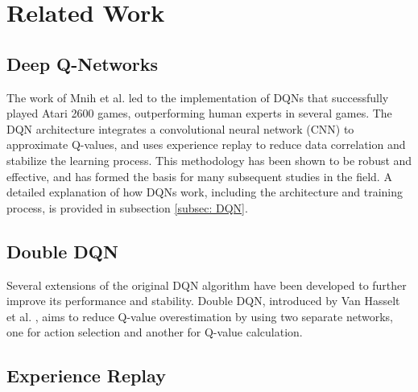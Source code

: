 \section{Related Work}

\subsection{Deep Q-Networks}

The work of Mnih et al. \cite{mnih2013playingatarideepreinforcement} led to the implementation of DQNs that successfully played Atari 2600 games, outperforming human experts in several games. The DQN architecture integrates a convolutional neural network (CNN) to approximate Q-values, and uses experience replay to reduce data correlation and stabilize the learning process. This methodology has been shown to be robust and effective, and has formed the basis for many subsequent studies in the field. A detailed explanation of how DQNs work, including the architecture and training process, is provided in subsection \ref{subsec: DQN}.

\subsection{Double DQN}
Several extensions of the original DQN algorithm have been developed to further improve its performance and stability. Double DQN, introduced by Van Hasselt et al. \cite{van_Hasselt_Guez_Silver_2016}, aims to reduce Q-value overestimation by using two separate networks, one for action selection and another for Q-value calculation.

\subsection{Experience Replay}




